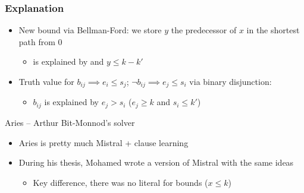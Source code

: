\begin{frame}
\frametitle{Explanation}

\begin{itemize}
  \item New bound  via Bellman-Ford: we store $y$ the predecessor of $x$ in the shortest path from $0$

  \begin{itemize}
    \item {} is explained by  and $y \leq k-k'$
  \end{itemize}

  \item Truth value for $b_{ij} \implies e_i \leq s_j$; $\neg b_{ij} \implies e_j \leq s_i$ via binary disjunction:

  \begin{itemize}
    \item $b_{ij}$ is explained by $e_j > s_i$ ($e_j \geq k$ and $s_i \leq k'$)
  \end{itemize}

\end{itemize}

\vfill

\begin{myblock}{Aries -- Arthur Bit-Monnod's solver}
\begin{itemize}
  \item Aries is pretty much Mistral + clause learning

  \vfill
  \item During his thesis, Mohamed wrote a version of Mistral with the same ideas

  \vfill
  \begin{itemize}
    \item Key difference, there was no literal for bounds ($x \leq k$)
  \end{itemize}
\end{itemize}

\end{myblock}

\vfill


\end{frame}
